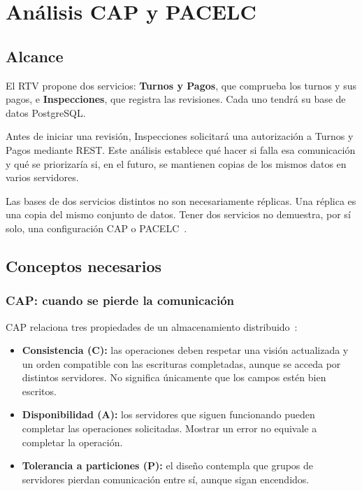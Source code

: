 \documentclass[11pt,a4paper]{article}
\begin{document}
	\section{Análisis CAP y PACELC}
	\label{sec:cap}
	\subsection{Alcance}
	
	El RTV propone dos servicios: \textbf{Turnos y Pagos}, que comprueba los turnos y sus pagos, e \textbf{Inspecciones}, que registra las revisiones. Cada uno tendrá su base de datos PostgreSQL.
	
	Antes de iniciar una revisión, Inspecciones solicitará una autorización a Turnos y Pagos mediante REST. Este análisis establece qué hacer si falla esa comunicación y qué se priorizaría si, en el futuro, se mantienen copias de los mismos datos en varios servidores.
	
	Las bases de dos servicios distintos no son necesariamente réplicas. Una réplica es una copia del mismo conjunto de datos. Tener dos servicios no demuestra, por sí solo, una configuración CAP o PACELC~\cite{camilleri_horizontally_2024}.
	
	\subsection{Conceptos necesarios}
	
	\subsubsection{CAP: cuando se pierde la comunicación}
	
	CAP relaciona tres propiedades de un almacenamiento distribuido~\cite{camilleri_horizontally_2024,calatrava_holistic_2022}:
	
	\begin{itemize}[nosep]
		\item \textbf{Consistencia (C):} las operaciones deben respetar una visión actualizada y un orden compatible con las escrituras completadas, aunque se acceda por distintos servidores. No significa únicamente que los campos estén bien escritos.
		\item \textbf{Disponibilidad (A):} los servidores que siguen funcionando pueden completar las operaciones solicitadas. Mostrar un error no equivale a completar la operación.
		\item \textbf{Tolerancia a particiones (P):} el diseño contempla que grupos de servidores pierdan comunicación entre sí, aunque sigan encendidos.
	\end{itemize}
	
\end{document}
